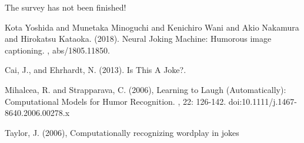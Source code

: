 \documentclass[twoside,twocolumn]{article}
\begin{document}
The survey has not been finished!



\begin{thebibliography}{99} %


Kota Yoshida and Munetaka Minoguchi and Kenichiro Wani and Akio Nakamura and Hirokatsu Kataoka. (2018).
\newblock Neural Joking Machine: Humorous image captioning.
, abs/1805.11850.

Cai, J., and Ehrhardt, N. (2013). 
\newblock Is This A Joke?.

Mihalcea, R. and Strapparava, C. (2006), 
\newblock Learning to Laugh (Automatically): Computational Models for Humor Recognition.
, 22: 126-142. doi:10.1111/j.1467-8640.2006.00278.x

Taylor, J. (2006), 
\newblock Computationally recognizing wordplay in jokes

\end{thebibliography}

\end{document}
